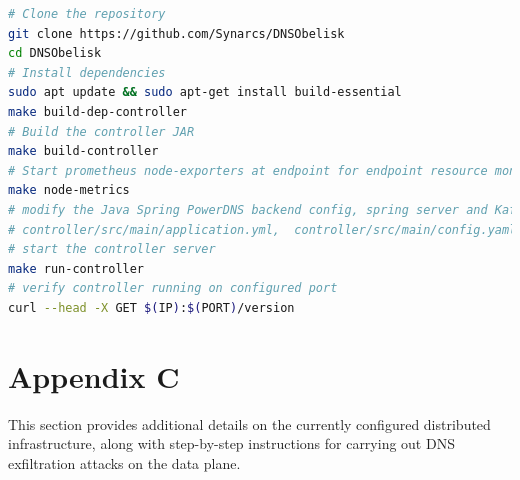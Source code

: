 \documentclass [11pt, proquest] {uwthesis}[2020/02/24]
\begin{document}
{\footnotesize
\begin{lstlisting}[language=bash, 
    caption={Installation steps for eBPF Node agent at endpoint in data plane}, 
    label={lst:install-steps},
    aboveskip=0.5em, 
    belowskip=0.5em
]
# Clone the repository
git clone https://github.com/Synarcs/DNSObelisk
cd DNSObelisk
# Install dependencies
sudo apt update && sudo apt-get install build-essential 
make build-dep-controller 
# Build the controller JAR
make build-controller 
# Start prometheus node-exporters at endpoint for endpoint resource monitoring 
make node-metrics
# modify the Java Spring PowerDNS backend config, spring server and Kafka broker connection config to point to correct endpoints
# controller/src/main/application.yml,  controller/src/main/config.yaml
# start the controller server
make run-controller
# verify controller running on configured port
curl --head -X GET $(IP):$(PORT)/version 
\end{lstlisting}
}




\section{Appendix C}
This section provides additional details on the currently configured distributed infrastructure, along with step-by-step instructions for carrying out DNS exfiltration attacks on the data plane.
\end{document}
